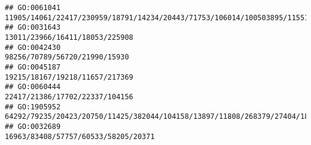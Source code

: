 \documentclass[
]{article}
\begin{document}
\begin{verbatim}
## GO:0061041                                                                                                                                                                                                                                                                                                                                      11905/14061/22417/230959/18791/14234/20443/71753/106014/100503895/11551
## GO:0031643                                                                                                                                                                                                                                                                                                                                                                               13011/23966/16411/18053/225908
## GO:0042430                                                                                                                                                                                                                                                                                                                                                                                98256/70789/56720/21990/15930
## GO:0045187                                                                                                                                                                                                                                                                                                                                                                               19215/18167/19218/11657/217369
## GO:0060444                                                                                                                                                                                                                                                                                                                                                                               22417/21386/17702/22337/104156
## GO:1905952                                                                                                                                                                                                                                                                                                                       64292/79235/20423/20750/11425/382044/104158/13897/11808/268379/27404/18095/21943/14419
## GO:0032689                                                                                                                                                                                                                                                                                                                                                                          16963/83408/57757/60533/58205/20371

\end{verbatim}
\end{document}
